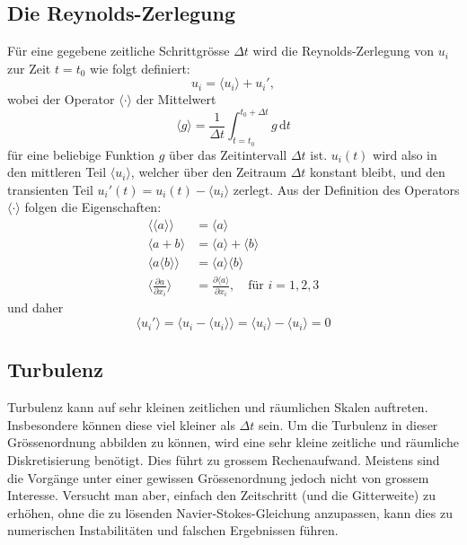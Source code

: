 \subsection{Die Reynolds-Zerlegung}
%
Für eine gegebene zeitliche Schrittgrösse $\Delta t$ wird die Reynolds-Zerlegung von $u_i$ zur Zeit $t = t_0$
wie folgt definiert:
%
\newcommand{\ravg}[1]{\ensuremath{\langle #1 \rangle}}
\newcommand{\rdecomp}[1]{\ensuremath{\ravg{#1} + #1'}}
%
\begin{equation}
    \label{reynolds:eqs:reynolds-decomp}
    u_i = \rdecomp{u_i},
\end{equation}
%
wobei der Operator $\ravg{\cdot}$ der Mittelwert
%
\begin{equation}
    \ravg{g} = \frac{1}{\Delta t}\int_{t=t_0}^{t_0 + \Delta t} g \mathrm{\,d}t
\end{equation}
%
für eine beliebige Funktion $g$ über das Zeitintervall $\Delta t$ ist.
%
$u_i(t)$ wird also in den mittleren Teil $\ravg{u_i}$, welcher über den Zeitraum
$\Delta t$ konstant bleibt, und den transienten Teil $u_i'(t) = u_i(t) - \langle u_i \rangle$
zerlegt.
%
Aus der Definition des Operators $\ravg{\cdot}$ folgen die Eigenschaften:
%
\begin{align}
    \ravg{\ravg{a}} &= \ravg{a} \\
    \ravg{a + b} &= \ravg{a} + \ravg{b} \\
    \ravg{a \ravg{b}} &= \ravg{a} \ravg{b} \\
    \label{reynolds:eqs:ravg-partial}
    \ravg{\frac{\partial a}{\partial x_i}} &=
        \frac{\partial \ravg{a}}{\partial x_i},\quad\text{für $i = 1, 2, 3$}
\end{align}
%
und daher
%
\begin{equation}
    \label{reynolds:eqs:trans-cancel}
    \ravg{u_i'} = \ravg{u_i - \ravg{u_i}} = \ravg{u_i} - \ravg{u_i} = 0
\end{equation}
%
\subsection{Turbulenz}
%
Turbulenz kann auf sehr kleinen zeitlichen und räumlichen Skalen auftreten.
Insbesondere können diese viel kleiner als $\Delta t$ sein. Um die Turbulenz in dieser
Grössenordnung abbilden zu können, wird eine sehr kleine zeitliche und räumliche Diskretisierung
benötigt. Dies führt zu grossem Rechenaufwand. Meistens sind die Vorgänge unter
einer gewissen Grössenordnung jedoch nicht von grossem Interesse. Versucht man aber, einfach den Zeitschritt
(und die Gitterweite) zu erhöhen, ohne die zu lösenden Navier-Stokes-Gleichung
anzupassen, kann dies zu numerischen Instabilitäten und falschen Ergebnissen führen.
%
